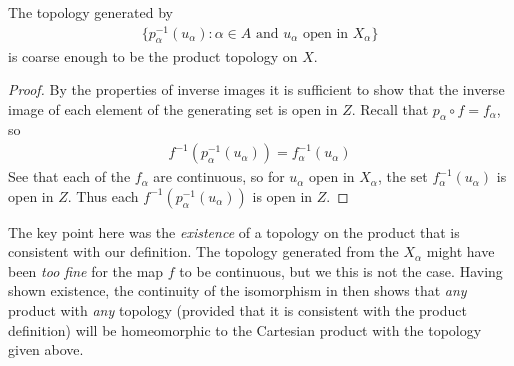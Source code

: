         \begin{claim}
          The topology generated by 
          \begin{align*}
            \{p_\alpha^{-1}(u_\alpha):\alpha\in A\text{ and } u_\alpha\text{ open in }X_\alpha\}
          \end{align*}
          is coarse enough to be the product topology on $X$.
          \begin{proof}
            By the properties of inverse images it is sufficient to show that the inverse image of each element of the generating set is open in $Z$.
            Recall that $p_\alpha\circ f=f_\alpha$, so 
            \begin{align*}
              f^{-1}(p_\alpha^{-1}(u_\alpha)) = f_\alpha^{-1}(u_\alpha)
            \end{align*}
            See that each of the $f_\alpha$ are continuous, so for $u_\alpha$ open in $X_\alpha$, the set $f_\alpha^{-1}(u_\alpha)$ is open in $Z$.
            Thus each $f^{-1}(p_\alpha^{-1}(u_\alpha))$ is open in $Z$.
          \end{proof}
        \end{claim}

        \begin{rmk}
          The key point here was the \emph{existence} of a topology on the product that is consistent with our definition. 
          The topology generated from the $X_\alpha$ might have been \emph{too fine} for the map $f$ to be continuous, but we this is not the case.
          Having shown existence, the continuity of the isomorphism in  then shows that \emph{any} product with \emph{any}  topology (provided that it is consistent with the product definition) will be homeomorphic to the Cartesian product with the topology given above.
        \end{rmk}

